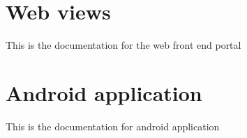 \documentclass[letterpaper,10pt,english]{sphinxmanual}
\begin{document}
\section{Web views}
\label{\detokenize{web:web-views}}\label{\detokenize{web::doc}}
This is the documentation for the web front end portal


\begin{figure}[htbp]
\centering

\noindent{}
\end{figure}


\begin{figure}[htbp]
\centering

\noindent{}
\end{figure}


\begin{figure}[htbp]
\centering

\noindent{}
\end{figure}


\begin{figure}[htbp]
\centering

\noindent{}
\end{figure}


\begin{figure}[htbp]
\centering

\noindent{}
\end{figure}


\begin{figure}[htbp]
\centering

\noindent{}
\end{figure}


\section{Android application}
\label{\detokenize{android:android-application}}\label{\detokenize{android::doc}}
This is the documentation for android application
\end{document}
